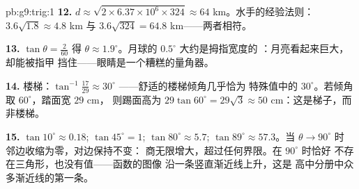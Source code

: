 \begin{solution}{pb:g9:trig:1}
\textbf{12.} $d \approx \sqrt{2 \times 6.37 \times 10^6 \times
324} \approx 64$ km。水手的经验法则：$3.6\sqrt{1.8} \approx
4.8$ km 与 $3.6\sqrt{324} = 64.8$ km——两者相符。

\textbf{13.} $\tan\theta = \frac{2}{60}$ 得 $\theta \approx
1.9^\circ$。月球的 $0.5^\circ$ 大约是拇指宽度的
\emph{}：月亮看起来巨大，却能被指甲
挡住——眼睛是一个糟糕的量角器。

\textbf{14.} 楼梯：$\tan^{-1}\frac{17}{29} \approx 30^\circ$
——舒适的楼梯倾角几乎恰为
特殊值中的 $30^\circ$。若倾角取 $60^\circ$，踏面宽 $29$ cm，
则踢面高为 $29\tan 60^\circ = 29\sqrt3 \approx
50$ cm：这是梯子，而非楼梯。

\textbf{15.} $\tan 10^\circ \approx 0.18$;
$\tan 45^\circ = 1$; $\tan 80^\circ \approx 5.7$;
$\tan 89^\circ \approx 57.3$。当 $\theta \to 90^\circ$ 时
邻边收缩为零，对边保持不变：
商无限增大，超过任何界限。在 $90^\circ$ 时恰好
不存在三角形，也没有值——函数的图像
沿一条竖直渐近线上升，这是
高中分册中众多渐近线的第一条。
\end{solution}
